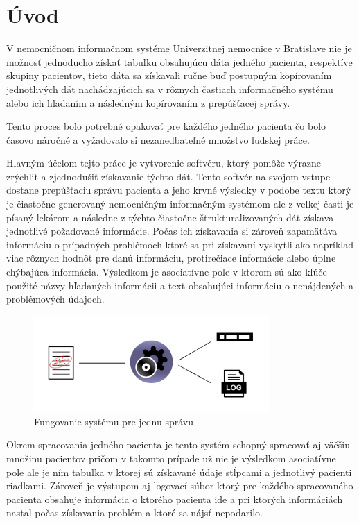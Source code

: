 \chapter*{Úvod} %

V nemocničnom informačnom systéme Univerzitnej nemocnice v Bratislave nie je možnosť jednoducho získať tabuľku obsahujúcu dáta jedného pacienta, respektíve skupiny pacientov, tieto dáta sa získavali ručne buď postupným kopírovaním jednotlivých dát nachádzajúcich sa v rôznych častiach informačného systému alebo ich hľadaním a následným kopírovaním z prepúšťacej správy.

Tento proces bolo potrebné opakovať pre každého jedného pacienta čo bolo časovo náročné a vyžadovalo si nezanedbateľné množstvo ľudskej práce.

Hlavným účelom tejto práce je vytvorenie softvéru, ktorý pomôže výrazne zrýchliť a zjednodušiť získavanie týchto dát. Tento softvér na svojom vstupe dostane prepúšťaciu správu pacienta a jeho krvné výsledky v podobe textu ktorý je čiastočne generovaný nemocničným informačným systémom ale z veľkej časti je písaný lekárom a následne z týchto čiastočne štrukturalizovaných dát získava jednotlivé požadované informácie. Počas ich získavania si zároveň zapamätáva informáciu o prípadných problémoch ktoré sa pri získavaní vyskytli ako napríklad viac rôznych hodnôt pre danú informáciu, protirečiace informácie alebo úplne chýbajúca informácia. Výsledkom je asociatívne pole v ktorom sú ako kľúče použité názvy hľadaných informácii a text obsahujúci informáciu o nenájdených a problémových údajoch. 

\begin{figure}
	\centerline{\includegraphics[width=0.8\textwidth]{images/system_jedna_sprava}}
	\caption[Fungovanie systému pre jednu správu]{Fungovanie systému pre jednu správu}
	\label{obr:systemJedna}
\end{figure}
\newpage
Okrem spracovania jedného pacienta je tento systém schopný spracovať aj väčšiu množinu pacientov pričom v takomto prípade už nie je výsledkom asociatívne pole ale je ním tabuľka v ktorej sú získavané údaje stĺpcami a jednotlivý pacienti riadkami. Zároveň je výstupom aj logovací súbor ktorý pre každého spracovaného pacienta obsahuje informácia o ktorého pacienta ide a pri ktorých informáciách nastal počas získavania problém a ktoré sa nájsť nepodarilo.

